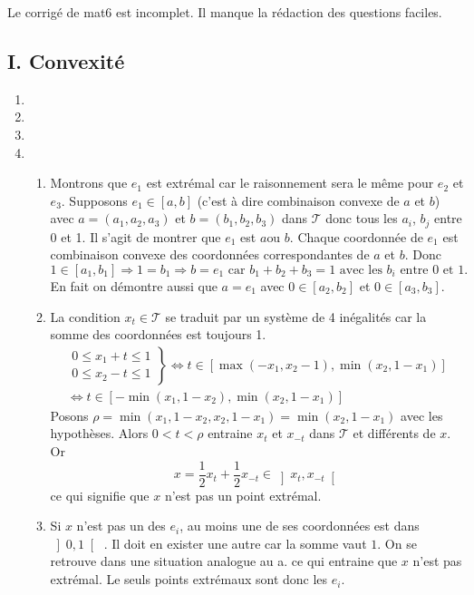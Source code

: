 Le corrigé de mat6 est incomplet. Il manque la rédaction des questions \og faciles\fg.
\subsection*{I. Convexité}
\begin{enumerate}
 \item
 \item 
 \item
 \item 
 \begin{enumerate}
  \item Montrons que $e_1$ est extrémal car le raisonnement sera le même pour $e_2$ et $e_3$.\newline
  Supposons $e_1 \in \left[ a, b\right]$ (c'est à dire combinaison convexe de $a$ et $b$) avec $a=(a_1,a_2,a_3)$ et $b=(b_1,b_2,b_3)$ dans $\mathcal{T}$ donc tous les $a_i$, $b_j$ entre 0 et 1. Il s'agit de montrer que $e_1$ est $a$ou $b$.\newline
  Chaque coordonnée de $e_1$ est combinaison convexe des coordonnées correspondantes de $a$ et $b$. Donc
\[
  1 \in \left[ a_1,b_1\right] \Rightarrow
1 = b_1  \Rightarrow b = e_1 \text{ car } b_1 + b_2 + b_3 = 1 \text{ avec les $b_i$ entre 0 et 1.}
\]
En fait on démontre aussi que $a=e_1$ avec $0 \in \left[ a_2,b_2\right]$ et $0 \in \left[ a_3,b_3\right]$.

  \item La condition $x_t \in \mathcal{T}$ se traduit par un système de 4 inégalités car la somme des coordonnées est toujours 1.
\begin{multline*}
\left. 
\begin{aligned}
 0 \leq x_1 + t \leq 1 \\ 0 \leq x_2 - t \leq 1
\end{aligned}
\right\rbrace 
\Leftrightarrow t \in \left[ \max(-x_1,x_2-1),\min(x_2,1-x_1)\right] \\
\Leftrightarrow t \in \left[ -\min(x_1,1 - x_2),\min(x_2,1-x_1)\right]
\end{multline*}
Posons $\rho = \min(x_1,1 - x_2,x_2,1-x_1) = \min(x_2, 1-x_1)$ avec les hypothèses.\newline
Alors $0 < t < \rho$ entraine $x_t$ et $x_{-t}$ dans $\mathcal{T}$ et différents de $x$. Or
\[
 x = \frac{1}{2}x_t + \frac{1}{2}x_{-t} \in \left] x_t, x_{-t}\right[ 
\]
ce qui signifie que $x$ n'est pas un point extrémal.

  \item Si $x$ n'est pas un des $e_i$, au moins une de ses coordonnées est dans $\left] 0,1\right[$ . Il doit en exister une autre car la somme vaut $1$. On se retrouve dans une situation analogue au a. ce qui entraine que $x$ n'est pas extrémal. Le seuls points extrémaux sont donc les $e_i$.
 \end{enumerate}

\end{enumerate}

